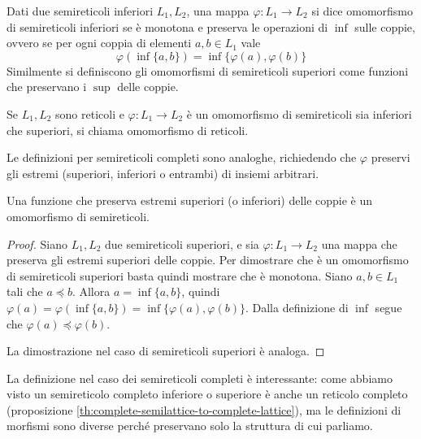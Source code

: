\documentclass[12pt]{article}
\numberwithin{theorem}{subsection}
\begin{document}
\begin{definition}
	Dati due semireticoli inferiori $L_1, L_2$, una mappa $\varphi: L_1 \rightarrow L_2$ si dice omomorfismo di semireticoli inferiori se è monotona e preserva le operazioni di $\inf$ sulle coppie, ovvero se per ogni coppia di elementi $a, b \in L_1$ vale
	\[
		\varphi(\inf \{ a, b \}) = \inf \{ \varphi(a), \varphi(b) \}
	\]
	Similmente si definiscono gli omomorfismi di semireticoli superiori come funzioni che preservano i $\sup$ delle coppie.
	
	Se $L_1, L_2$ sono reticoli e $\varphi: L_1 \rightarrow L_2$ è un omomorfismo di semireticoli sia inferiori che superiori, si chiama omomorfismo di reticoli.
	
	Le definizioni per semireticoli completi sono analoghe, richiedendo che $\varphi$ preservi gli estremi (superiori, inferiori o entrambi) di insiemi arbitrari.
\end{definition}

\begin{prop}\label{th:sup-coppie-monotona}
	Una funzione che preserva estremi superiori (o inferiori) delle coppie è un omomorfismo di semireticoli.
\end{prop}
\begin{proof}
	Siano $L_1, L_2$ due semireticoli superiori, e sia $\varphi : L_1 \rightarrow L_2$ una mappa che preserva  gli estremi superiori delle coppie. Per dimostrare che è un omomorfismo di semireticoli superiori basta quindi mostrare che è monotona.
	Siano $a, b \in L_1$ tali che $a \preceq b$. Allora $a = \inf \{ a, b \}$, quindi $\varphi(a) = \varphi(\inf \{ a, b \}) = \inf \{ \varphi(a), \varphi(b) \}$. Dalla definizione di $\inf$ segue che $\varphi(a) \preceq \varphi(b)$.
	
	La dimostrazione nel caso di semireticoli superiori è analoga.
\end{proof}

La definizione nel caso dei semireticoli completi è interessante: come abbiamo visto un semireticolo completo inferiore o superiore è anche un reticolo completo (proposizione \ref{th:complete-semilattice-to-complete-lattice}), ma le definizioni di morfismi sono diverse perché preservano solo la struttura di cui parliamo.
\end{document}
